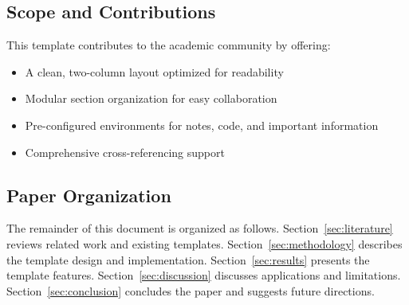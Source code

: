 \subsection{Scope and Contributions}

This template contributes to the academic community by offering:

\begin{itemize}
    \item A clean, two-column layout optimized for readability
    \item Modular section organization for easy collaboration
    \item Pre-configured environments for notes, code, and important information
    \item Comprehensive cross-referencing support
\end{itemize}

\subsection{Paper Organization}

The remainder of this document is organized as follows. Section~\ref{sec:literature} reviews related work and existing templates. Section~\ref{sec:methodology} describes the template design and implementation. Section~\ref{sec:results} presents the template features. Section~\ref{sec:discussion} discusses applications and limitations. Section~\ref{sec:conclusion} concludes the paper and suggests future directions.